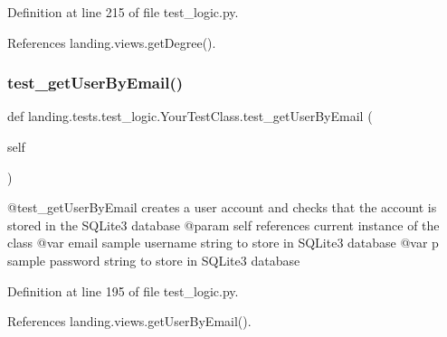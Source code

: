 Definition at line 215 of file test\+\_\+logic.\+py.



References landing.\+views.\+get\+Degree().

\mbox{\label{classlanding_1_1tests_1_1test__logic_1_1YourTestClass_a052a9215642dc369fea184e2e6882b91}} 
\subsubsection{\texorpdfstring{test\+\_\+get\+User\+By\+Email()}{test\_getUserByEmail()}}
{\footnotesize\ttfamily def landing.\+tests.\+test\+\_\+logic.\+Your\+Test\+Class.\+test\+\_\+get\+User\+By\+Email (\begin{DoxyParamCaption}\item[{}]{self }\end{DoxyParamCaption})}

\begin{DoxyVerb}    @test_getUserByEmail creates a user account and checks that the account is stored in the SQLite3 database
    @param self references current instance of the class
    @var email sample username string to store in SQLite3 database
    @var p  sample password string to store in SQLite3 database\end{DoxyVerb}
 

Definition at line 195 of file test\+\_\+logic.\+py.



References landing.\+views.\+get\+User\+By\+Email().

\mbox{\label{classlanding_1_1tests_1_1test__logic_1_1YourTestClass_a27205d7c768e925bf201ff242d7c6137}} 
